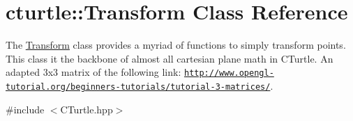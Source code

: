 \hypertarget{classcturtle_1_1Transform}{}\section{cturtle\+:\+:Transform Class Reference}
\label{classcturtle_1_1Transform}


The \hyperlink{classcturtle_1_1Transform}{Transform} class provides a myriad of functions to simply transform points. This class it the backbone of almost all cartesian plane math in C\+Turtle. An adapted 3x3 matrix of the following link\+: \href{http://www.opengl-tutorial.org/beginners-tutorials/tutorial-3-matrices/}{\tt http\+://www.\+opengl-\/tutorial.\+org/beginners-\/tutorials/tutorial-\/3-\/matrices/}.  




{\ttfamily \#include $<$C\+Turtle.\+hpp$>$}

